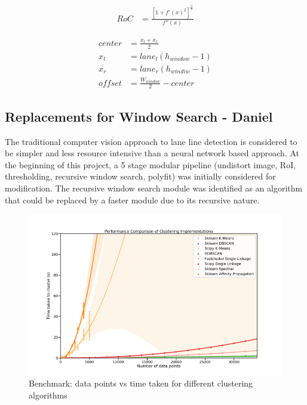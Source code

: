 \documentclass[twoside,twocolumn]{article}
\begin{document}
\begin{align} \label{eq:ROC}
RoC &= \frac{[1 + f'(x)^2]^\frac{3}{2}}{f''(x)}
\end{align}

\begin{subequations}
\begin{align}
center &= \frac{x_{l} + x_{r}}{2} \\
x_{l} &= lane_{l}(h_{window} - 1) \\
x_{r} &= lane_{r}(h_{windiw} - 1) \\
offset &= \frac{W_{window}}{2} - center \label{eq:offset}
\end{align}
\end{subequations}

\subsection{Replacements for Window Search - Daniel}

\par The traditional computer vision approach to lane line detection is considered to be simpler and less resource intensive than a neural network based approach. At the beginning of this project, a 5 stage modular pipeline (undistort image, RoI, thresholding, recursive window search, polyfit) was initially considered for modification. The recursive window search module was identified as an algorithm that could be replaced by a faster module due to its recursive nature.

\begin{figure}
  \includegraphics[width=\linewidth]{daniel1.png}
  \caption{Benchmark: data points vs time taken for different clustering algorithms}
  \label{fig:d1}
\end{figure}
\end{document}
